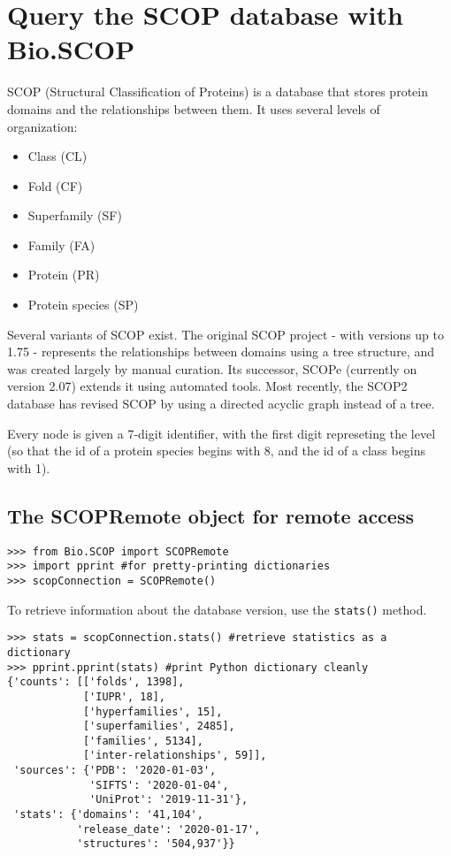 \chapter{Query the SCOP database with Bio.SCOP}
\label{chapter:scop}

SCOP (Structural Classification of Proteins) is a database that stores protein domains and 
the relationships between them. It uses several levels of organization:
\begin{itemize}
\item Class (CL)
\item Fold (CF)
\item Superfamily (SF)
\item Family (FA)
\item Protein (PR)
\item Protein species (SP)
\end{itemize}

Several variants of SCOP exist. The original SCOP project - with versions up to 1.75 - 
represents the relationships between domains using a tree structure, and was created 
largely by manual curation. Its successor, SCOPe (currently on version 2.07) extends 
it using automated tools. Most recently, the SCOP2 database has revised SCOP by using a 
directed acyclic graph instead of a tree.

Every node is given a 7-digit identifier, with the first digit represeting the level (so that 
the id of a protein species begins with 8, and the id of a class begins with 1). 

\section{The SCOPRemote object for remote access}
\label{sec:SCOPRemote}

\begin{verbatim}
>>> from Bio.SCOP import SCOPRemote
>>> import pprint #for pretty-printing dictionaries
>>> scopConnection = SCOPRemote()
\end{verbatim}

To retrieve information about the database version, use the \verb|stats()| method.

\begin{verbatim}
>>> stats = scopConnection.stats() #retrieve statistics as a dictionary
>>> pprint.pprint(stats) #print Python dictionary cleanly
{'counts': [['folds', 1398],
            ['IUPR', 18],
            ['hyperfamilies', 15],
            ['superfamilies', 2485],
            ['families', 5134],
            ['inter-relationships', 59]],
 'sources': {'PDB': '2020-01-03',
             'SIFTS': '2020-01-04',
             'UniProt': '2019-11-31'},
 'stats': {'domains': '41,104',
           'release_date': '2020-01-17',
           'structures': '504,937'}}
\end{verbatim}


